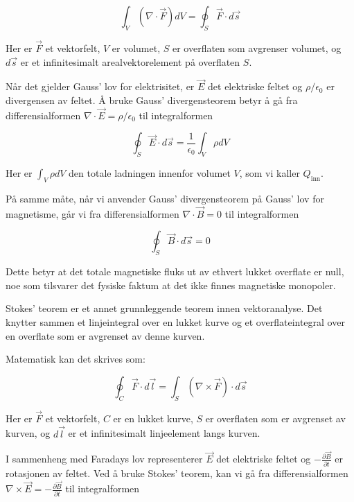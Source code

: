 \begin{equation*}
\int_V (\nabla \cdot \vec{F}) dV = \oint_S \vec{F} \cdot d\vec{s}
\end{equation*}

Her er $\vec{F}$ et vektorfelt, $V$ er volumet, $S$ er overflaten som avgrenser volumet, og $d\vec{s}$ er et infinitesimalt arealvektorelement på overflaten $S$.

Når det gjelder Gauss' lov for elektrisitet, er $\vec{E}$ det elektriske feltet og $\rho/\epsilon_0$ er divergensen av feltet. Å bruke Gauss' divergensteorem betyr å gå fra differensialformen $\nabla \cdot \vec{E} = \rho/\epsilon_0$ til integralformen

\begin{equation*}
\oint_S \vec{E} \cdot d\vec{s} = \frac{1}{\epsilon_0}\int_V \rho dV
\end{equation*}

Her er $\int_V \rho dV$ den totale ladningen innenfor volumet $V$, som vi kaller $Q_{\text{inn}}$.

På samme måte, når vi anvender Gauss' divergensteorem på Gauss' lov for magnetisme, går vi fra differensialformen $\nabla \cdot \vec{B} = 0$ til integralformen

\begin{equation*}
\oint_S \vec{B} \cdot d\vec{s} = 0
\end{equation*}

Dette betyr at det totale magnetiske fluks ut av ethvert lukket overflate er null, noe som tilsvarer det fysiske faktum at det ikke finnes magnetiske monopoler.

Stokes' teorem er et annet grunnleggende teorem innen vektoranalyse. Det knytter sammen et linjeintegral over en lukket kurve og et overflateintegral over en overflate som er avgrenset av denne kurven.

Matematisk kan det skrives som:

\begin{equation*}
\oint_C \vec{F} \cdot d\vec{l} = \int_S (\nabla \times \vec{F}) \cdot d\vec{s}
\end{equation*}

Her er $\vec{F}$ et vektorfelt, $C$ er en lukket kurve, $S$ er overflaten som er avgrenset av kurven, og $d\vec{l}$ er et infinitesimalt linjeelement langs kurven.

I sammenheng med Faradays lov representerer $\vec{E}$ det elektriske feltet og $-\frac{\partial \vec{B}}{\partial t}$ er rotasjonen av feltet. Ved å bruke Stokes' teorem, kan vi gå fra differensialformen $\nabla \times \vec{E} = -\frac{\partial \vec{B}}{\partial t}$ til integralformen

